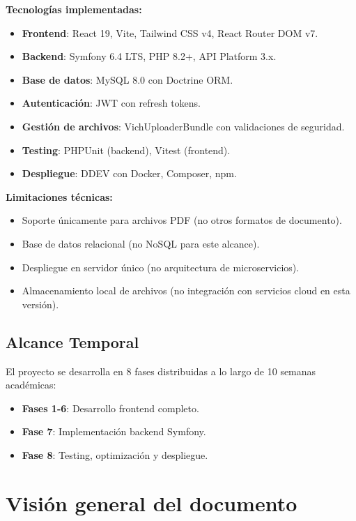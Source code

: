 \documentclass[12pt,a4paper,oneside]{report}
\providecommand{\tightlist}{%
  \setlength{\itemsep}{0pt}\setlength{\parskip}{0pt}}
\begin{document}
\textbf{Tecnologías implementadas:}

\begin{itemize}
\tightlist
\item
  \textbf{Frontend}: React 19, Vite, Tailwind CSS v4, React Router DOM
  v7.
\item
  \textbf{Backend}: Symfony 6.4 LTS, PHP 8.2+, API Platform 3.x.
\item
  \textbf{Base de datos}: MySQL 8.0 con Doctrine ORM.
\item
  \textbf{Autenticación}: JWT con refresh tokens.
\item
  \textbf{Gestión de archivos}: VichUploaderBundle con validaciones de
  seguridad.
\item
  \textbf{Testing}: PHPUnit (backend), Vitest (frontend).
\item
  \textbf{Despliegue}: DDEV con Docker, Composer, npm.
\end{itemize}

\textbf{Limitaciones técnicas:}

\begin{itemize}
\tightlist
\item
  Soporte únicamente para archivos PDF (no otros formatos de documento).
\item
  Base de datos relacional (no NoSQL para este alcance).
\item
  Despliegue en servidor único (no arquitectura de microservicios).
\item
  Almacenamiento local de archivos (no integración con servicios cloud
  en esta versión).
\end{itemize}

\subsection{Alcance Temporal}\label{alcance-temporal}

El proyecto se desarrolla en 8 fases distribuidas a lo largo de 10
semanas académicas:

\begin{itemize}
\tightlist
\item
  \textbf{Fases 1-6}: Desarrollo frontend completo.
\item
  \textbf{Fase 7}: Implementación backend Symfony.
\item
  \textbf{Fase 8}: Testing, optimización y despliegue.
\end{itemize}

\section{Visión general del
documento}\label{visiuxf3n-general-del-documento}
\end{document}
